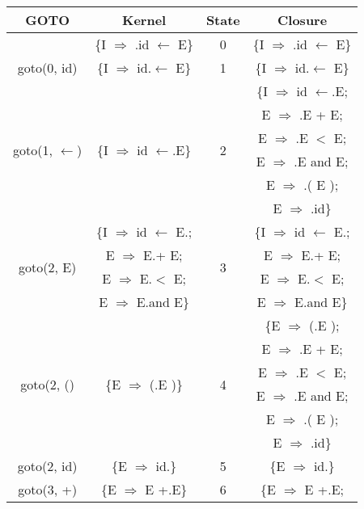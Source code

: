 \begin{table}[H]
  \hspace{-1.4cm}
  \begin{minipage}[t]{.4\linewidth}
    \centering
    \begin{tabular}{|c|c|c|c|}
      \hline
      GOTO & Kernel & State & Closure\\
      \hline
      &	\{I $\Rightarrow$ .id $\leftarrow$ E\} & 0 & \{I $\Rightarrow$ .id $\leftarrow$ E\}\\
      \hline
      goto(0, id)	& \{I $\Rightarrow$ id.$\leftarrow$ E\} &	1	&	\{I $\Rightarrow$ id.$\leftarrow$ E\}\\
      \hline
      \multirow{6}{*}{goto(1, $\leftarrow$)} & \multirow{6}{*}{\{I $\Rightarrow$ id $\leftarrow$.E\}} & \multirow{6}{*}{2} & \{I $\Rightarrow$ id $\leftarrow$.E;\\
      & & & E $\Rightarrow$ .E + E;\\
      & & & E $\Rightarrow$ .E $<$ E;\\
      & & & E $\Rightarrow$ .E and E;\\
      & & & E $\Rightarrow$ .( E );\\
      & & & E $\Rightarrow$ .id\}\\
      \hline
      \multirow{4}{*}{goto(2, E)} & \{I $\Rightarrow$ id $\leftarrow$ E.; & \multirow{4}{*}{3} & \{I $\Rightarrow$ id $\leftarrow$ E.;\\
      & E $\Rightarrow$ E.+ E; & & E $\Rightarrow$ E.+ E; \\
      & E $\Rightarrow$ E.$<$ E; & & E $\Rightarrow$ E.$<$ E; \\
      & E $\Rightarrow$ E.and E\} & & E $\Rightarrow$ E.and E\} \\
      \hline
      \multirow{6}{*}{goto(2, ()} & \multirow{6}{*}{\{E $\Rightarrow$ (.E )\}} & \multirow{6}{*}{4}	& \{E $\Rightarrow$ (.E );\\
      & & & E $\Rightarrow$ .E + E;\\
      & & & E $\Rightarrow$ .E $<$ E;\\
      & & & E $\Rightarrow$ .E and E; \\
      & & & E $\Rightarrow$ .( E );\\
      & & & E $\Rightarrow$ .id\}\\
      \hline
      goto(2, id) & \{E $\Rightarrow$ id.\} & 5 & \{E $\Rightarrow$ id.\}\\
      \hline
      \multirow{5}{*}{goto(3, +)} & \multirow{5}{*}{\{E $\Rightarrow$ E +.E\}}	& \multirow{5}{*}{6}	& \{E $\Rightarrow$ E +.E; \\

\end{tabular}
\end{minipage}
\end{table}
